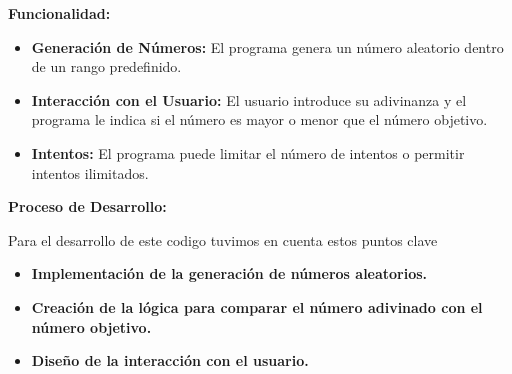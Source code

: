 \documentclass[a4paper]{article}
\begin{document}
\bigskip


\bigskip


\bigskip


\bigskip


\bigskip


\bigskip


\bigskip


\bigskip


\bigskip

{
\textbf{Funcionalidad:}}


\bigskip

\begin{itemize}[resume*=listWWNumiii]
\item {
\textbf{Generación de Números:} El programa genera un número aleatorio dentro de un rango predefinido.}
\item {
\textbf{Interacción con el Usuario:} El usuario introduce su adivinanza y el programa le indica si el número es mayor o
menor que el número objetivo.}
\item {
\textbf{Intentos:} El programa puede limitar el número de intentos o permitir intentos ilimitados.}
\end{itemize}
{
\textbf{Proceso de Desarrollo:}}


\bigskip

{
Para el desarrollo de este codigo tuvimos en cuenta estos puntos clave}

\begin{itemize}[resume*=listWWNumiii]
\item {
\textbf{Implementación de la generación de números aleatorios.}}
\item {
\textbf{Creación de la lógica para comparar el número adivinado con el número objetivo.}}
\item {
\textbf{Diseño de la interacción con el usuario.}}
\end{itemize}

\bigskip


\bigskip


\bigskip


\bigskip


\bigskip


\bigskip


\bigskip


\bigskip


\bigskip
\end{document}
